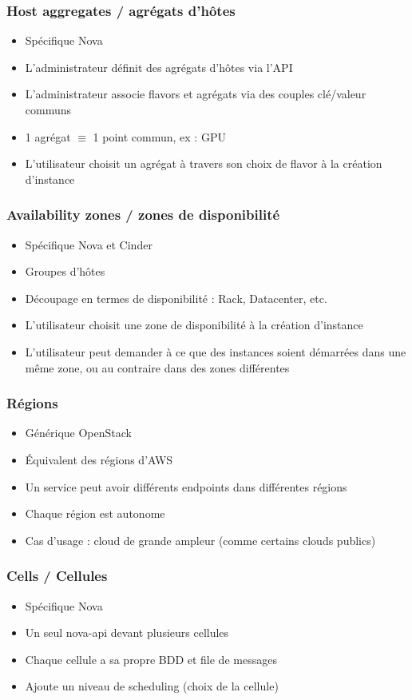   \begin{frame}
    \frametitle{Host aggregates / agrégats d'hôtes}
    \begin{itemize}
      \item Spécifique Nova
      \item L'administrateur définit des agrégats d'hôtes via l'API
      \item L'administrateur associe flavors et agrégats via des couples clé/valeur communs
      \item 1 agrégat $\equiv$ 1 point commun, ex : GPU
      \item L'utilisateur choisit un agrégat à travers son choix de flavor à la création d'instance
    \end{itemize}
  \end{frame}

  \begin{frame}
    \frametitle{Availability zones / zones de disponibilité}
    \begin{itemize}
      \item Spécifique Nova et Cinder
      \item Groupes d'hôtes
      \item Découpage en termes de disponibilité : Rack, Datacenter, etc.
      \item L'utilisateur choisit une zone de disponibilité à la création d'instance
      \item L'utilisateur peut demander à ce que des instances soient démarrées dans une même zone, ou au contraire dans des zones différentes
    \end{itemize}
  \end{frame}

  \begin{frame}
    \frametitle{Régions}
    \begin{itemize}
      \item Générique OpenStack
      \item Équivalent des régions d'AWS
      \item Un service peut avoir différents endpoints dans différentes régions
      \item Chaque région est autonome
      \item Cas d'usage : cloud de grande ampleur (comme certains clouds publics)
    \end{itemize}
  \end{frame}

  \begin{frame}
    \frametitle{Cells / Cellules}
    \begin{itemize}
      \item Spécifique Nova
      \item Un seul nova-api devant plusieurs cellules
      \item Chaque cellule a sa propre BDD et file de messages
      \item Ajoute un niveau de scheduling (choix de la cellule)
    \end{itemize}
  \end{frame}

